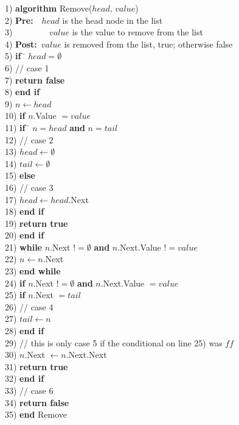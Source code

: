 \newpage
\begin{tabbing}
1)  \textbf{alg}\= \textbf{orithm} Remove($head$, $value$) \\
2)  \> \textbf{Pre:}~~$head$ is the head node in the list \\
3)  \> ~~~~~~~~$value$ is the value to remove from the list \\
4)  \> \textbf{Post:}~$value$ is removed from the list, true; otherwise false \\
5)  \> \textbf{if}~\= $head = \emptyset$ \\
6)  \> \> // case 1 \\
7)  \> \> \textbf{return false} \\
8)  \> \textbf{end if} \\
9)  \> $n \leftarrow head$ \\
10) \> \textbf{if} $n$.Value $= value$ \\
11) \> \> \textbf{if}~\= $n = head$ \textbf{and} $n = tail$ \\
12) \> \> \> // case 2 \\
13) \> \> \> $head \leftarrow \emptyset$ \\
14) \> \> \> $tail \leftarrow \emptyset$ \\
15) \> \> \textbf{else} \\
16) \> \> \> // case 3 \\
17) \> \> \> $head \leftarrow head$.Next \\
18) \> \> \textbf{end if} \\
19) \> \> \textbf{return true} \\
20) \> \textbf{end if} \\
21) \> \textbf{while} $n$.Next $!= \emptyset$ \textbf{and} $n$.Next.Value $!= value$ \\
22) \> \> $n \leftarrow n$.Next \\
23) \> \textbf{end while} \\
24) \> \textbf{if} $n$.Next $!= \emptyset$ \textbf{and} $n$.Next.Value $= value$ \\
25) \> \> \textbf{if} $n$.Next $= tail$ \\
26) \> \> \> // case 4 \\
27) \> \> \> $tail \leftarrow n$ \\
28) \> \> \textbf{end if} \\
29) \> \> // this is only case 5 if the conditional on line 25) was $ff$ \\
30) \> \> $n$.Next $\leftarrow n$.Next.Next \\
31) \> \> \textbf{return true} \\
32) \> \textbf{end if} \\
33) \> // case 6 \\
34) \> \textbf{return false} \\
35) \textbf{end} Remove \\
\end{tabbing}

